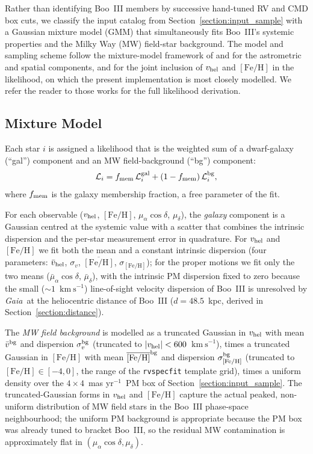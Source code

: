 \documentclass[twocolumn]{aastex631}
\newcommand{\gaia}{\textit{Gaia}\xspace}
\newcommand{\vlosUnits}{$\mathrm{km~s}^{-1}$\xspace}
\newcommand{\pmUnits}{mas yr$^{-1}$\xspace}
\begin{document}
Rather than identifying Boo~III members by successive hand-tuned RV and CMD box cuts, we classify the input catalog from Section~\ref{section:input_sample} with a Gaussian mixture model (GMM) that simultaneously fits Boo~III's systemic properties and the Milky Way (MW) field-star background. The model and sampling scheme follow the mixture-model framework of \citet{Pace2019} and \citet{Pace2022} for the astrometric and spatial components, and \citet{Sandford2025} for the joint inclusion of $v_{\rm hel}$ and $[\mathrm{Fe/H}]$ in the likelihood, on which the present implementation is most closely modelled. We refer the reader to those works for the full likelihood derivation.

\subsection{Mixture Model}
Each star $i$ is assigned a likelihood that is the weighted sum of a dwarf-galaxy (``gal'') component and an MW field-background (``bg'') component:
\begin{equation} \label{eq:gmm_mix}
\mathcal{L}_i = f_{\rm mem}\,\mathcal{L}_i^{\rm gal} + (1 - f_{\rm mem})\,\mathcal{L}_i^{\rm bg},
\end{equation}
where $f_{\rm mem}$ is the galaxy membership fraction, a free parameter of the fit.

For each observable ($v_{\rm hel}$, $[\mathrm{Fe/H}]$, $\mu_\alpha\cos\delta$, $\mu_\delta$), the \emph{galaxy} component is a Gaussian centred at the systemic value with a scatter that combines the intrinsic dispersion and the per-star measurement error in quadrature. For $v_{\rm hel}$ and $[\mathrm{Fe/H}]$ we fit both the mean and a constant intrinsic dispersion (four parameters: $\bar v_{\rm hel}$, $\sigma_v$, $\overline{[\mathrm{Fe/H}]}$, $\sigma_{[\mathrm{Fe/H}]}$); for the proper motions we fit only the two means ($\bar\mu_\alpha\cos\delta$, $\bar\mu_\delta$), with the intrinsic PM dispersion fixed to zero because the small ($\sim 1$~\vlosUnits) line-of-sight velocity dispersion of Boo~III is unresolved by \gaia\ at the heliocentric distance of Boo~III ($d = 48.5$~kpc, derived in Section~\ref{section:distance}).

The \emph{MW field background} is modelled as a truncated Gaussian in $v_{\rm hel}$ with mean $\bar v^{\rm bg}$ and dispersion $\sigma_v^{\rm bg}$ (truncated to $|v_{\rm hel}| < 600$~\vlosUnits), times a truncated Gaussian in $[\mathrm{Fe/H}]$ with mean $\overline{[\mathrm{Fe/H}]}^{\rm bg}$ and dispersion $\sigma_{[\mathrm{Fe/H}]}^{\rm bg}$ (truncated to $[\mathrm{Fe/H}] \in [-4, 0]$, the range of the \texttt{rvspecfit} template grid), times a uniform density over the $4 \times 4$~\pmUnits\ PM box of Section~\ref{section:input_sample}. The truncated-Gaussian forms in $v_{\rm hel}$ and $[\mathrm{Fe/H}]$ capture the actual peaked, non-uniform distribution of MW field stars in the Boo~III phase-space neighbourhood; the uniform PM background is appropriate because the PM box was already tuned to bracket Boo~III, so the residual MW contamination is approximately flat in $(\mu_\alpha\cos\delta, \mu_\delta)$.
\end{document}
